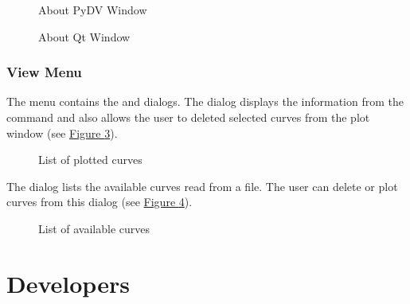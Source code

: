 \documentclass[letterpaper,10pt,english]{sphinxmanual}
\begin{document}
\begin{figure}[htbp]
\centering
\capstart

\noindent{}
\caption{About PyDV Window}\label{\detokenize{ui_features:id6}}\label{\detokenize{ui_features:about-1}}\end{figure}

\begin{figure}[htbp]
\centering
\capstart

\noindent{}
\caption{About Qt Window}\label{\detokenize{ui_features:id7}}\label{\detokenize{ui_features:about-2}}\end{figure}


\subsection{View Menu}
\label{\detokenize{ui_features:view-menu}}
The  menu contains the  and  dialogs. The  dialog displays the information from the  command and also allows the user to deleted selected curves from the plot window (see \hyperref[\detokenize{ui_features:list}]{Figure \ref{\detokenize{ui_features:list}}}).

\begin{figure}[htbp]
\centering
\capstart

\noindent{}
\caption{List of plotted curves}\label{\detokenize{ui_features:id8}}\label{\detokenize{ui_features:list}}\end{figure}

The  dialog lists the available curves read from a file. The user can delete or plot curves from this dialog (see \hyperref[\detokenize{ui_features:menu}]{Figure \ref{\detokenize{ui_features:menu}}}).

\begin{figure}[htbp]
\centering
\capstart

\noindent{}
\caption{List of available curves}\label{\detokenize{ui_features:id9}}\label{\detokenize{ui_features:menu}}\end{figure}


\chapter{Developers}
\label{\detokenize{index:developers}}
\end{document}
